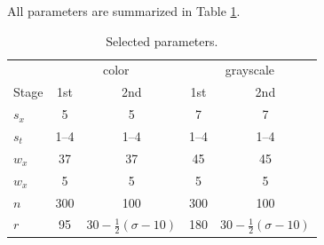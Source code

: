 \documentclass[10pt, journal, twocolumn, final, a4paper]{IEEEtran}
\begin{document}
All parameters are summarized in Table \ref{tab:parameters}.

%


\begin{table}
	\centering
	\begin{tabular}{l | c c | c c }
		& \multicolumn{2}{c|}{color} 
		& \multicolumn{2}{c}{grayscale}\\
		Stage                            & 1st    & 2nd   & 1st   & 2nd   \\\hline\hline
		$s_x$        &  5 & 5 & 7 & 7 \\
		$s_t$        &  1--4  & 1--4  & 1--4  & 1--4  \\
		$w_x$        &  37    & 37    & 45    & 45    \\
		$w_x$        &   5    & 5     & 5     & 5    \\
		$n$          & 300    & 100   & 300   & 100  \\
		$r$          & 95   & $30 - \frac12(\sigma - 10)$    & 180  & $30 - \frac12(\sigma - 10)$   \\
	\end{tabular}
	\caption{Selected parameters.}
	\label{tab:parameters}
\end{table}
\end{document}
